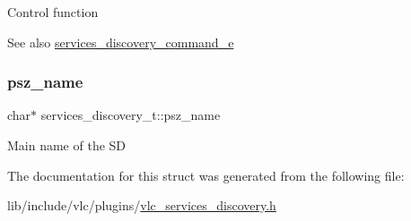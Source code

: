 Control function \begin{DoxySeeAlso}{See also}
\hyperlink{vlc__services__discovery_8h_a921bb104d6f034e60446f6b67bad95e8}{services\+\_\+discovery\+\_\+command\+\_\+e} 
\end{DoxySeeAlso}
\mbox{\label{structservices__discovery__t_a943a6b17e106d5ac925e4f7231254e85}} 
\subsubsection{\texorpdfstring{psz\+\_\+name}{psz\_name}}
{\footnotesize\ttfamily char$\ast$ services\+\_\+discovery\+\_\+t\+::psz\+\_\+name}

Main name of the SD 

The documentation for this struct was generated from the following file\+:\begin{DoxyCompactItemize}
\item 
lib/include/vlc/plugins/\hyperlink{vlc__services__discovery_8h}{vlc\+\_\+services\+\_\+discovery.\+h}\end{DoxyCompactItemize}

